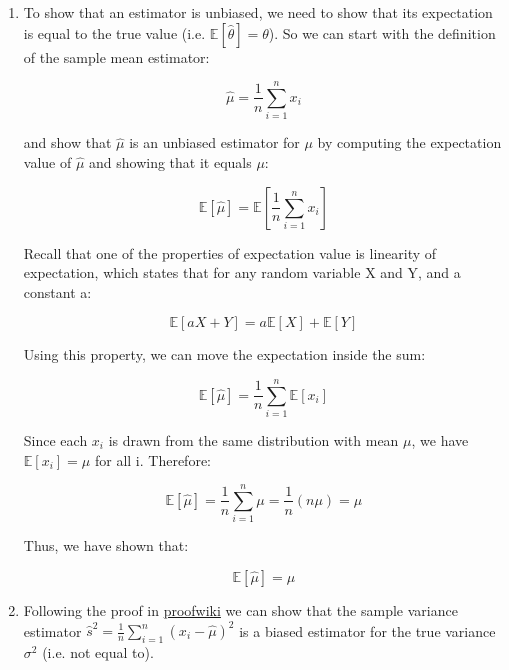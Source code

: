 \documentclass[10pt]{article}
\begin{document}
\begin{enumerate}[label=(\alph*)]
	\item To show that an estimator is unbiased, we need to show that its expectation is equal to the true value (i.e. $\mathbb{E}[\hat{\theta}] = \theta$). So we can start with the definition of the sample mean estimator:

	      \[ \hat{\mu} = \frac{1}{n} \sum_{i=1}^{n} x_i \]

	      and show that $\hat{\mu}$ is an unbiased estimator for $\mu$ by computing the expectation value of $\hat{\mu}$ and showing that it equals $\mu$:

	      \[ \mathbb{E}[\hat{\mu}] = \mathbb{E}\left[\frac{1}{n} \sum_{i=1}^{n} x_i\right] \]

	      Recall that one of the properties of expectation value is linearity of expectation, which states that for any random variable X and Y, and a constant a:

	      \[ \mathbb{E}[aX + Y] = a\mathbb{E}[X] + \mathbb{E}[Y] \]

	      Using this property, we can move the expectation inside the sum:

	      \[ \mathbb{E}[\hat{\mu}] = \frac{1}{n} \sum_{i=1}^{n} \mathbb{E}[x_i] \]

	      Since each $x_i$ is drawn from the same distribution with mean $\mu$, we have $\mathbb{E}[x_i] = \mu$ for all i. Therefore:

	      \[ \mathbb{E}[\hat{\mu}] = \frac{1}{n} \sum_{i=1}^{n} \mu = \frac{1}{n} (n\mu) = \mu \]

	      Thus, we have shown that:

	      \[ \boxed{\mathbb{E}[\hat{\mu}] = \mu} \]

	\item Following the proof in \href{https://proofwiki.org/wiki/Bias_of_Sample_Variance}{proofwiki} we can show that the sample variance estimator $\hat{s}^2 = \frac{1}{n} \sum_{i=1}^{n} (x_i - \hat{\mu})^2$ is a biased estimator for the true variance $\sigma^2$ (i.e. not equal to).


\end{enumerate}
\end{document}
